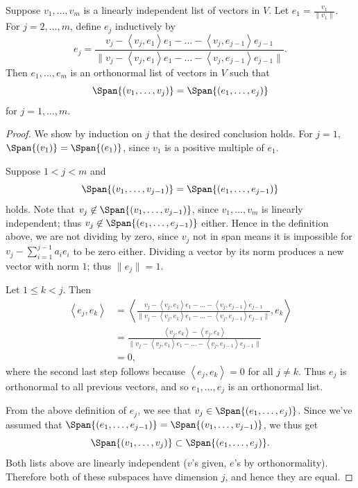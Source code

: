 \documentclass[math0540-lecture-notes.tex]{subfiles}
\begin{document}
\begin{theorem}{}
  Suppose $v_1,\ldots,v_m$ is a linearly independent list of vectors in $V$. Let
  $e_1=\frac{v_1}{\|v_1\|}$. For $j=2,\ldots,m$, define $e_j$ inductively by \[
    e_j=\frac{v_j-\left<v_j,e_1 \right>e_1-\ldots-\left<v_j,e_{j-1}
    \right>e_{j-1}}{\|v_j-\left<v_j,e_1 \right>e_1-\ldots-\left<v_j,e_{j-1} \right>e_{j-1}\|}
  .\] Then $e_1,\ldots,e_m$ is an orthonormal list of vectors in $V$ such that \[
  \Span{(v_1,\ldots,v_j)}=\Span{(e_1,\ldots,e_j)}
  \] for $j=1,\ldots,m$.
\end{theorem}
\begin{proof}[Proof]
  We show by induction on $j$ that the desired conclusion holds. For $j=1$,
  $\Span{(v_1)}=\Span{(e_1)}$, since $ v_1$ is a positive multiple of $e_1$.

  Suppose $1<j<m$ and \[
    \Span{(v_1,\ldots,v_{j-1})}=\Span{(e_1,\ldots,e_{j-1})}
  \] holds. Note that $v_j\not\in \Span{(v_1,\ldots,v_{j-1})}$, since $v_1,\ldots,v_m$ is linearly
  independent; thus $v_j\not\in \Span{(e_1,\ldots,e_{j-1})}$ either. Hence in the definition above,
  we are not dividing by zero, since $v_j$ not in span means it is impossible for
  $v_j-\sum_{i=1}^{j-1} a_ie_i$ to be zero either. Dividing a vector by its norm produces a new
  vector with norm $1$; thus $\|e_j\|=1$.

  Let $1\le k<j$. Then
  \begin{align*}
    \left<e_j,e_k \right> &= \left<\frac{v_j-\left<v_j,e_1 \right>e_1-\ldots-\left<v_j,e_{j-1}
    \right>e_{j-1}}{\|v_j-\left<v_j,e_1 \right>e_1-\ldots-\left<v_j,e_{j-1} \right>e_{j-1}\|},e_k \right> \\
    &= \frac{\left<v_j,e_k \right>-\left<v_j,e_k \right>}{\|v_j-\left<v_j,e_1 \right>e_1-\ldots-\left<v_j,e_{j-1} \right>e_{j-1}\|} \\
    &=0
  ,\end{align*}
  where the second last step follows because $\left<e_j,e_k \right>=0$ for all $j\neq k$. Thus $e_j$
  is orthonormal to all previous vectors, and so $e_1,\ldots,e_j$ is an orthonormal list.

  From the above definition of $e_j$, we see that $v_j\in \Span{(e_1,\ldots,e_j)}$. Since we've
  assumed that $\Span{(e_1,\ldots,e_{j-1})}=\Span{(v_1,\ldots,v_{j-1})}$, we thus get \[
    \Span{(v_1,\ldots,v_j)}\subset\Span{(e_1,\ldots,e_j)}
  .\] Both lists above are linearly independent ($v$'s given, $e$'s by orthonormality). Therefore
  both of these subspaces have dimension $j$, and hence they are equal.
\end{proof}
\end{document}
